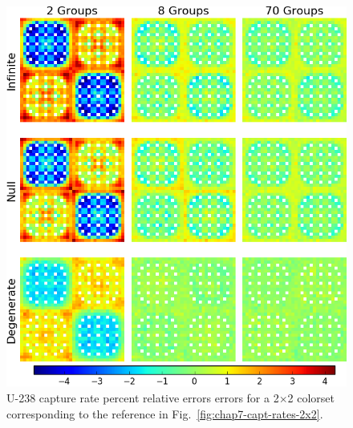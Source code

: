 \begin{figure}[h!]
\centering
\includegraphics[width=\linewidth]{figures/quantification/2x2/capt-err}
\caption[U-238 capture rate errors for a 2$\times$2 colorset]{U-238 capture rate percent relative errors errors for a 2$\times$2 colorset corresponding to the reference in Fig.~\ref{fig:chap7-capt-rates-2x2}.}
\label{fig:chap8-2x2-capt-err}
\end{figure}

\clearpage


